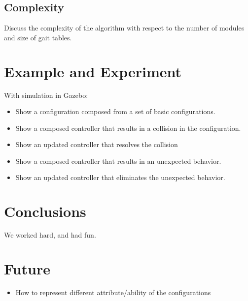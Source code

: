 \documentclass[conference]{IEEEtran}
\begin{document}
\subsection{Complexity}
Discuss the complexity of the algorithm with respect to the number of modules and size of gait tables.

\section{Example and Experiment}
With simulation in Gazebo:
\begin{itemize}
\item Show a configuration composed from a set of basic configurations.
\item Show a composed controller that results in a collision in the configuration.
\item Show an updated controller that resolves the collision
\item Show a composed controller that results in an unexpected behavior.
\item Show an updated controller that eliminates the unexpected behavior.
\end{itemize}

\section{Conclusions}
We worked hard, and had fun.

\section{Future}
\begin{itemize}
\item How to represent different attribute/ability of the configurations
\end{itemize}







\end{document}
